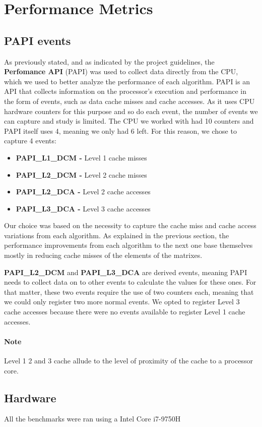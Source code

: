 \section{Performance Metrics}

\subsection{PAPI events}

As previously stated, and as indicated by the project guidelines, the \textbf{Perfomance API} (PAPI) was used to collect data directly from the CPU, which we used to better analyze the performance of each algorithm. 
PAPI is an API that collects information on the processor's execution and performance in the form of events, such as data cache misses and cache accesses. As it uses CPU hardware counters for this purpose and so do each event, the number of events we can capture and study is limited. The CPU we worked with had 10 counters and PAPI itself uses 4, meaning we only had 6 left. 
For this reason, we chose to capture 4 events:

\begin{itemize}
    \item \textbf{PAPI\_L1\_DCM - } Level 1 cache misses
    \item \textbf{PAPI\_L2\_DCM - } Level 2 cache misses
    \item \textbf{PAPI\_L2\_DCA - } Level 2 cache accesses
    \item \textbf{PAPI\_L3\_DCA - } Level 3 cache accesses
\end{itemize}

Our choice was based on the necessity to capture the cache miss and cache access variations from each algorithm. As explained in the previous section, the performance improvements from each algorithm to the next one base themselves mostly in reducing cache misses of the elements of the matrixes. 

\textbf{PAPI\_L2\_DCM} and \textbf{PAPI\_L3\_DCA} are derived events, meaning PAPI needs to collect data on to other events to calculate the values for these ones. For that matter, these two events require the use of two counters each, meaning that we could only register two more normal events. We opted to register Level 3 cache accesses because there were no events available to register Level 1 cache accesses. 

\paragraph{Note} Level 1 2 and 3 cache allude to the level of proximity of the cache to a processor core. 

\subsection{Hardware}
All the benchmarks were ran using a Intel Core i7-9750H